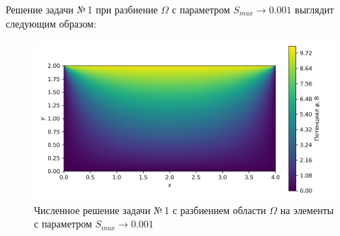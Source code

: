 \documentclass[12pt, a4paper]{article}
\begin{document}
			
			\newpage
			
			Решение задачи №\,1 при разбиение $\Omega$ с параметром $S_{max} \rightarrow 0.001$ выглядит следующим образом: 
			\vspace*{-5mm}
			\begin{figure}[!h]
				\centering
				\includegraphics[width=1\textwidth]{rect_dirichlet_only_0001_calfem.png}
				\caption{Численное решение задачи №\,1 с разбиением области $\Omega$ на элементы с параметром $S_{max} \rightarrow 0.001$}
				\label{fig:dom_rect_0001}
			\end{figure}
			
\end{document}
